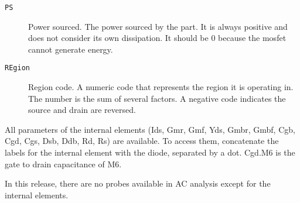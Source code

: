 \begin{description}
\item[{\tt PS}] Power sourced.  The power sourced by the part.  
It is always positive and does not consider its own dissipation.
It should be 0 because the mosfet cannot generate energy.

\item[{\tt REgion}] Region code.  A numeric code that represents the region
it is operating in.  The number is the sum of several factors.  A negative
code indicates the source and drain are reversed.


\end{description}

All parameters of the internal elements (Ids, Gmr, Gmf, Yds, Gmbr, Gmbf,
Cgb, Cgd, Cgs, Dsb, Ddb, Rd, Rs) are available.  To access them, concatenate
the labels for the internal element with the diode, separated by a dot.
Cgd.M6 is the gate to drain capacitance of M6.

In this release, there are no probes available in AC analysis except for the
internal elements.
